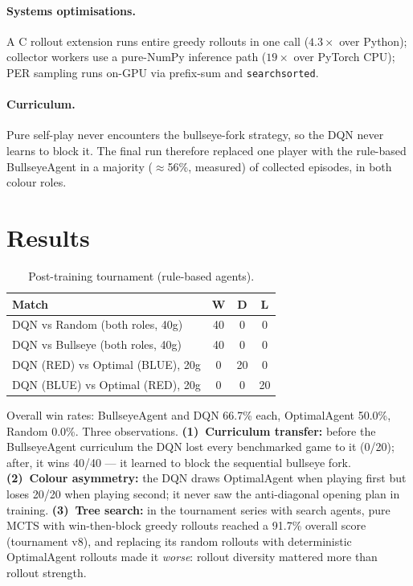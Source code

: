 \documentclass[10pt,twocolumn]{article}
\begin{document}
\paragraph{Systems optimisations.} A C rollout extension runs entire greedy
rollouts in one call ($4.3\times$ over Python); collector workers use a
pure-NumPy inference path ($19\times$ over PyTorch CPU); PER sampling runs
on-GPU via prefix-sum and \texttt{searchsorted}.

\paragraph{Curriculum.} Pure self-play never encounters the bullseye-fork
strategy, so the DQN never learns to block it. The final run therefore
replaced one player with the rule-based BullseyeAgent in a majority
($\approx$56\%, measured) of collected episodes, in both colour roles.

\section{Results}

\begin{table}[h]
\centering\footnotesize
\setlength{\tabcolsep}{3pt}
\begin{tabular}{lccc}
\toprule
\textbf{Match} & \textbf{W} & \textbf{D} & \textbf{L} \\
\midrule
DQN vs Random (both roles, 40g) & 40 & 0 & 0 \\
DQN vs Bullseye (both roles, 40g) & 40 & 0 & 0 \\
DQN (RED) vs Optimal (BLUE), 20g & 0 & 20 & 0 \\
DQN (BLUE) vs Optimal (RED), 20g & 0 & 0 & 20 \\
\bottomrule
\end{tabular}
\caption{Post-training tournament (rule-based agents).}
\label{tab:tournament}
\end{table}

Overall win rates: BullseyeAgent and DQN 66.7\% each, OptimalAgent 50.0\%,
Random 0.0\%. Three observations. \textbf{(1)~Curriculum transfer:} before
the BullseyeAgent curriculum the DQN lost every benchmarked game to it
(0/20); after, it wins 40/40 --- it learned to block the sequential bullseye
fork. \textbf{(2)~Colour asymmetry:} the DQN draws OptimalAgent when playing
first but loses 20/20 when playing second; it never saw the anti-diagonal
opening plan in training. \textbf{(3)~Tree search:} in the tournament series
with search agents, pure MCTS with win-then-block greedy rollouts reached a
91.7\% overall score (tournament v8), and replacing its random rollouts with
deterministic OptimalAgent rollouts made it \emph{worse}: rollout diversity
mattered more than rollout strength.
\end{document}
